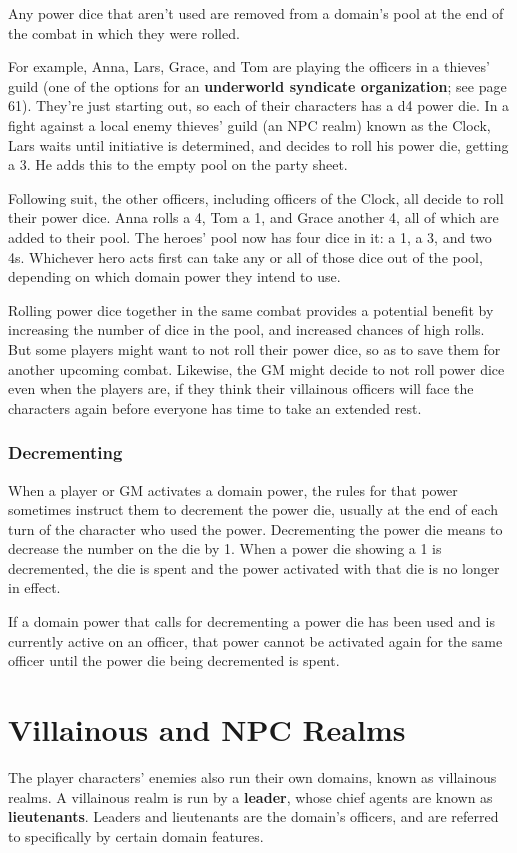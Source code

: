 \documentclass[10pt,a4paper,twoside,bg=print,twocolumn,openany,nodeprecatedcode]{dndbook}
\begin{document}
Any power dice that aren't used are removed from a domain's pool at the end of the combat in which they were rolled.

For example, Anna, Lars, Grace, and Tom are playing the officers in a thieves' guild (one of the options for an \textbf{underworld syndicate organization}; see page 61). They're just starting out, so each of their characters has a d4 power die. In a fight against a local enemy thieves' guild (an NPC realm) known as the Clock, Lars waits until initiative is determined, and decides to roll his power die, getting a 3. He adds this to the empty pool on the party sheet.

Following suit, the other officers, including officers of the Clock, all decide to roll their power dice. Anna rolls a 4, Tom a 1, and Grace another 4, all of which are added to their pool. The heroes' pool now has four dice in it: a 1, a 3, and two 4s. Whichever hero acts first can take any or all of those dice out of the pool, depending on which domain power they intend to use.

Rolling power dice together in the same combat provides a potential benefit by increasing the number of dice in the pool, and increased chances of high rolls. But some players might want to not roll their power dice, so as to save them for another upcoming combat. Likewise, the GM might decide to not roll power dice even when the players are, if they think their villainous officers will face the characters again before everyone has time to take an extended rest.

\subsubsection{Decrementing}
When a player or GM activates a domain power, the rules for that power sometimes instruct them to decrement the power die, usually at the end of each turn of the character who used the power. Decrementing the power die means to decrease the number on the die by 1. When a power die showing a 1 is decremented, the die is spent and the power activated with that die is no longer in effect.

If a domain power that calls for decrementing a power die has been used and is currently active on an officer, that power cannot be activated again for the same officer until the power die being decremented is spent.

\section{Villainous and NPC Realms}
The player characters' enemies also run their own domains, known as villainous realms. A villainous realm is run by a \textbf{leader}, whose chief agents are known as \textbf{lieutenants}. Leaders and lieutenants are the domain's officers, and are referred to specifically by certain domain features.
\end{document}
